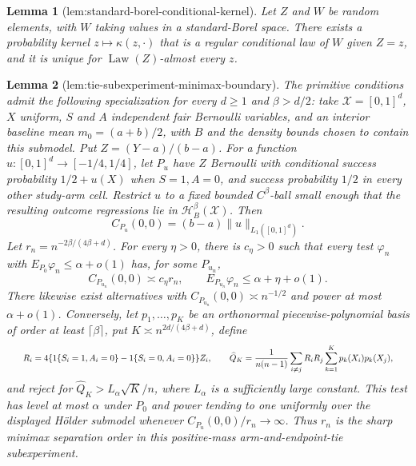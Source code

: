 \documentclass{article}
\newtheorem{lemma}{Lemma}
\begin{document}
\begin{lemma}[lem:standard-borel-conditional-kernel]\label{lem:standard-borel-conditional-kernel}
Let \(Z\) and \(W\) be random elements, with \(W\) taking values in a standard-Borel space. There exists a probability kernel \(z\mapsto\kappa(z,\cdot)\) that is a regular conditional law of \(W\) given \(Z=z\), and it is unique for \(\operatorname{Law}(Z)\)-almost every \(z\).
\end{lemma}

\begin{lemma}[lem:tie-subexperiment-minimax-boundary]\label{lem:tie-subexperiment-minimax-boundary}
The primitive conditions admit the following specialization for every \(d\ge1\) and \(\beta>d/2\): take \(\mathcal X=[0,1]^d\), \(X\) uniform, \(S\) and \(A\) independent fair Bernoulli variables, and an interior baseline mean \(m_0=(a+b)/2\), with \(B\) and the density bounds chosen to contain this submodel. Put \(Z=(Y-a)/(b-a)\). For a function \(u:[0,1]^d\to[-1/4,1/4]\), let \(P_u\) have \(Z\) Bernoulli with conditional success probability \(1/2+u(X)\) when \(S=1,A=0\), and success probability \(1/2\) in every other study-arm cell. Restrict \(u\) to a fixed bounded \(C^\beta\)-ball small enough that the resulting outcome regressions lie in \(\mathcal H_B^\beta(\mathcal X)\). Then\[C_{P_u}(0,0)=(b-a)\lVert u\rVert_{L_1([0,1]^d)}.\]Let \(r_n=n^{-2\beta/(4\beta+d)}\). For every \(\eta>0\), there is \(c_\eta>0\) such that every test \(\varphi_n\) with \(E_{P_0}\varphi_n\le\alpha+o(1)\) has, for some \(P_{u_n}\),\[C_{P_{u_n}}(0,0)\asymp c_\eta r_n,\qquad E_{P_{u_n}}\varphi_n\le\alpha+\eta+o(1).\]There likewise exist alternatives with \(C_{P_{u_n}}(0,0)\asymp n^{-1/2}\) and power at most \(\alpha+o(1)\). Conversely, let \(p_1,\ldots,p_K\) be an orthonormal piecewise-polynomial basis of order at least \(\lceil\beta\rceil\), put \(K\asymp n^{2d/(4\beta+d)}\), define \[
\makebox[\linewidth][c]{\resizebox{0.98\linewidth}{!}{\par\noindent \makebox[\linewidth][c]{\resizebox{0.98\linewidth}{!}{\(\displaystyle \displaystyle R_i=4\{1\{S_i=1,A_i=0\}-1\{S_i=0,A_i=0\}\}Z_i,\qquad \widehat Q_K=\frac{1}{n(n-1)}\sum_{i\ne j}R_iR_j\sum_{k=1}^Kp_k(X_i)p_k(X_j),\)}}\par\noindent}}
\]and reject for \(\widehat Q_K>L_\alpha\sqrt K/n\), where \(L_\alpha\) is a sufficiently large constant. This test has level at most \(\alpha\) under \(P_0\) and power tending to one uniformly over the displayed Hölder submodel whenever \(C_{P_u}(0,0)/r_n\to\infty\). Thus \(r_n\) is the sharp minimax separation order in this positive-mass arm-and-endpoint-tie subexperiment.
\end{lemma}
\end{document}
